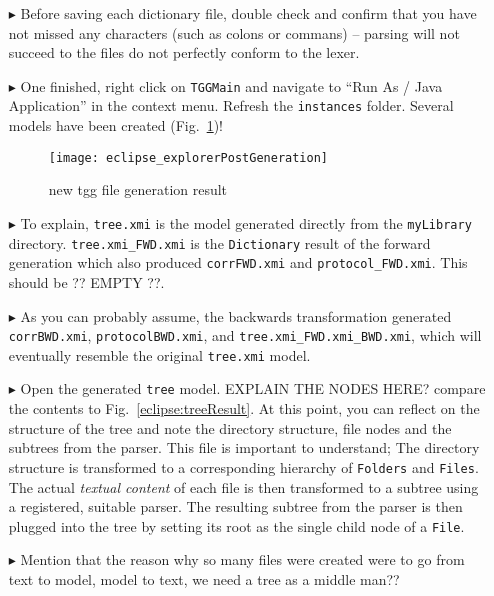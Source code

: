 \begin{enumerate}


\item[$\blacktriangleright$] Before saving each dictionary file, double check and confirm that you have not missed any characters (such as colons or
commans) -- parsing will not succeed to the files do not perfectly conform to the lexer. 

\item[$\blacktriangleright$] One finished, right click on \texttt{TGGMain} and navigate to ``Run As / Java Application'' in the context menu. Refresh the
\texttt{instances} folder. Several models have been created (Fig.~\ref{eclipse:postParse})! 

\begin{figure}[!htbp]
\begin{center}
 \texttt{[image: eclipse\_explorerPostGeneration]}
  \caption{new tgg file generation result}
  \label{eclipse:postParse}
\end{center}
\end{figure} 

\item[$\blacktriangleright$] To explain, \texttt{tree.xmi} is the model generated directly from the \texttt{myLibrary} directory. \texttt{tree.xmi\_FWD.xmi} is
the \texttt{Dictionary} result of the forward generation which also produced \texttt{corrFWD.xmi} and \texttt{protocol\_FWD.xmi}. This should be ?? EMPTY ??.

\item[$\blacktriangleright$] As you can probably assume, the backwards transformation generated \texttt{corrBWD.xmi}, \texttt{protocolBWD.xmi}, and
\texttt{tree.xmi\_FWD.xmi\_BWD.xmi}, which will eventually resemble the original \texttt{tree.xmi} model.

\item[$\blacktriangleright$] Open the generated \texttt{tree} model. \update EXPLAIN THE NODES HERE?
compare the contents to Fig.~\ref{eclipse:treeResult}. At this point, you can reflect on the structure of the tree and note the directory structure, file nodes
and the subtrees from the parser. This file is important to understand; The directory structure is transformed to a corresponding hierarchy of \texttt{Folders}
and \texttt{Files}. The actual \emph{textual content} of each file is then transformed to a subtree using a registered, suitable parser. The resulting subtree
from the parser is then plugged into the tree by setting its root as the single child node of a \texttt{File}.

\item[$\blacktriangleright$] \update Mention that the reason why so many files were created were to go from text to model, model to text, we need a tree as a
middle man??

\end{enumerate}

